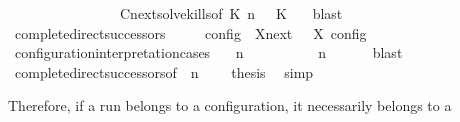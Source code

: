 \begin{isabellebody}
\ \ \ \ \ \ \ \ \ \ \ \ \ \ \ \ Cnext{\isacharunderscore}solve{\isacharunderscore}kills{\isacharbrackleft}of\ {\isacartoucheopen}K{}{\isacartoucheclose}\ {\isacartoucheopen}n{\isacartoucheclose}\ {\isacartoucheopen}{\isasymGamma}{\isacartoucheclose}\ {\isacartoucheopen}{\isasymPsi}{\isacartoucheclose}\ {\isacartoucheopen}K{}{\isacartoucheclose}\ {\isacartoucheopen}{\isasymPhi}{\isacartoucheclose}{\isacharbrackright}\ \isamarkupfalse%
\ blast\isanewline
\ \ \ \ \ \ \isamarkupfalse%
\isanewline
\ \ \isamarkupfalse%
%
\endisatagproof
{\isafoldproof}%
%
\isadelimproof
\isanewline
%
\endisadelimproof
\isanewline
{}\isamarkupfalse%
\ complete{\isacharunderscore}direct{\isacharunderscore}successors{\isacharprime}{\isacharcolon}\isanewline
\ \ \ {\isacartoucheopen}{\isasymlbrakk}\ {\isasymS}\ {\isasymrbrakk}\isactrlsub c\isactrlsub o\isactrlsub n\isactrlsub f\isactrlsub i\isactrlsub g\ {\isasymsubseteq}\ {\isacharparenleft}{\isasymUnion}X{\isasymin}{\isasymC}\isactrlsub n\isactrlsub e\isactrlsub x\isactrlsub t\ {\isasymS}{\isachardot}\ {\isasymlbrakk}\ X\ {\isasymrbrakk}\isactrlsub c\isactrlsub o\isactrlsub n\isactrlsub f\isactrlsub i\isactrlsub g{\isacharparenright}{\isacartoucheclose}\isanewline
%
\isadelimproof
%
\endisadelimproof
%
\isatagproof
{}\isamarkupfalse%
\ {\isacharminus}\isanewline
\ \ \isamarkupfalse%
\ configuration{\isacharunderscore}interpretation{\isachardot}cases\ \isamarkupfalse%
\ {\isasymGamma}\ n\ {\isasymPsi}\ {\isasymPhi}\isanewline
\ \ \ \ \ {\isacartoucheopen}{\isasymS}\ {\isacharequal}\ {\isacharparenleft}{\isasymGamma}{\isacharcomma}\ n\ {\isasymturnstile}\ {\isasymPsi}\ {\isasymtriangleright}\ {\isasymPhi}{\isacharparenright}{\isacartoucheclose}\ \isamarkupfalse%
\ blast\isanewline
\ \ \isamarkupfalse%
\ complete{\isacharunderscore}direct{\isacharunderscore}successors{\isacharbrackleft}of\ {\isacartoucheopen}{\isasymGamma}{\isacartoucheclose}\ {\isacartoucheopen}n{\isacartoucheclose}\ {\isacartoucheopen}{\isasymPsi}{\isacartoucheclose}\ {\isacartoucheopen}{\isasymPhi}{\isacartoucheclose}{\isacharbrackright}\ \isamarkupfalse%
\ {\isacharquery}thesis\ \isamarkupfalse%
\ simp\isanewline
{}\isamarkupfalse%
%
\endisatagproof
{\isafoldproof}%
%
\isadelimproof
%
\endisadelimproof
%
\begin{isamarkuptext}%
Therefore, if a run belongs to a configuration, it necessarily belongs to a

\end{isamarkuptext}
\end{isabellebody}

